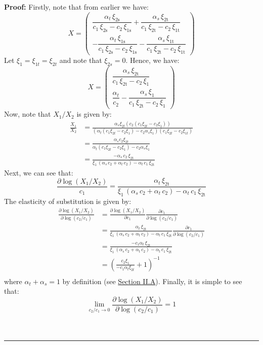 \documentclass[11pt,a4paper]{extarticle}
\newenvironment{proof}[1][Proof]{\noindent\textbf{#1:} }{\ \rule{0.5em}{0.5em}}
\begin{document}
\begin{proof}
	Firstly, note that from earlier we have:
	$$
	X = \begin{pmatrix}
		\dfrac{\alpha _{t}\,\xi _{\mathrm{2s}}}{c_{1}\,\xi _{\mathrm{2s}}-c_{2}\,\xi _{\mathrm{1s}}}+\dfrac{\alpha _{s}\,\xi _{\mathrm{2t}}}{c_{1}\,\xi _{\mathrm{2t}}-c_{2}\,\xi _{\mathrm{1t}}} \\[2ex] 
		-\dfrac{\alpha _{t}\,\xi _{\mathrm{1s}}}{c_{1}\,\xi _{\mathrm{2s}}-c_{2}\,\xi _{\mathrm{1s}}}-\dfrac{\alpha _{s}\,\xi _{\mathrm{1t}}}{c_{1}\,\xi _{\mathrm{2t}}-c_{2}\,\xi _{\mathrm{1t}}}
	\end{pmatrix}
	$$
	Let $\xi_1 = \xi_{1t} = \xi_{2t}$ and note that $\xi_{2s} = 0$. Hence, we have:
	$$
	X = \begin{pmatrix}
	\dfrac{\alpha _{s}\,\xi _{\mathrm{2t}}}{c_{1}\,\xi _{\mathrm{2t}}-c_{2}\,\xi _{\mathrm{1}}} \\
	\dfrac{\alpha _{t}}{c_{2}}-\dfrac{\alpha _{s}\,\xi _{\mathrm{1}}}{c_{1}\,\xi _{\mathrm{2t}}-c_{2}\,\xi _{\mathrm{1}}}
	\end{pmatrix}
	$$
	Now, note that $X_1/X_2$ is given by:
	\begin{align*}
	\frac{X_1}{X_2} &= \frac{\alpha_s \xi_{2t} \left( c_2 ( c_1 \xi_{2t} - c_2 \xi_{1} ) \right)}{ \left( \alpha_t (c_1 \xi_{2t} - c_2 \xi_{1}) -  c_2 \alpha_s \xi_1 \right) (c_1 \xi_{2t} - c_2 \xi_{1t})}  \\
	&= \frac{\alpha_s c_2 \xi_{2t}}{ \alpha_t (c_1 \xi_{2t} - c_2 \xi_{1}) -  c_2 \alpha_s \xi_1 }\\
	&= \frac{-\alpha _{s}\,c_{2}\,\xi _{\mathrm{2t}}}{\xi _{1}\,\left(\alpha _{s}\,c_{2}+\alpha _{t}\,c_{2}\right)-\alpha _{t}\,c_{1}\,\xi _{\mathrm{2t}}}
	\end{align*}
	 Next, we can see that:
	$$
	\frac{\partial \log(X_1/X_2)}{c_1} = \frac{\alpha _{t}\,\xi _{\mathrm{2t}}}{\xi _{1}\,\left(\alpha _{s}\,c_{2}+\alpha _{t}\,c_{2}\right)-\alpha _{t}\,c_{1}\,\xi _{\mathrm{2t}}}
	$$
	The elasticity of substitution is given by:
	\begin{align*}
	\frac{\partial \log(X_1/X_2)}{\partial \log(c_2/c_1)} &= \frac{\partial \log(X_1/X_2)}{\partial c_1}\frac{\partial c_1}{\partial \log(c_2/c_1)} \\
	&= \frac{\alpha _{t}\,\xi _{\mathrm{2t}}}{\xi _{1}\,\left(\alpha _{s}\,c_{2}+\alpha _{t}\,c_{2}\right)-\alpha _{t}\,c_{1}\,\xi _{\mathrm{2t}}}\frac{\partial c_1}{\partial \log(c_2/c_1)} \\
	&= \frac{-c_1 \alpha _{t}\,\xi _{\mathrm{2t}}}{\xi _{1}\,\left(\alpha _{s}\,c_{2}+\alpha _{t}\,c_{2}\right)-\alpha _{t}\,c_{1}\,\xi _{\mathrm{2t}}}\\
	&= \left( \frac{c_2 \xi_1 }{-c_1 \alpha_t \xi_{2t}} + 1 \right)^{-1} \\
	\end{align*}
	where $\alpha_t + \alpha_s = 1$ by definition (see \hyperref[sec:consumers]{Section II.A}). Finally, it is simple to see that:
	$$ \lim_{c_2/c_1 \to 0} \frac{\partial \log(X_1/X_2)}{\partial \log(c_2/c_1)} = 1$$
	\\ \hfill
\end{proof}
\end{document}
